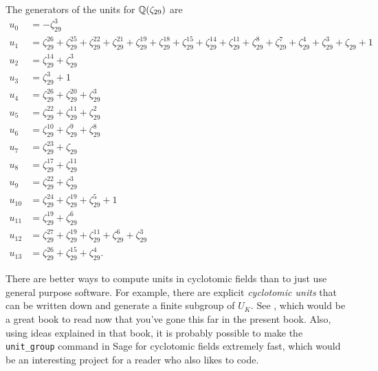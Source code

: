 The generators of the units for $\mathbb{Q}(\zeta_{29})$ are
\begin{align*}
u_{0} &= -\zeta_{29}^{3}\\
u_{1} &= \zeta_{29}^{26} + \zeta_{29}^{25} + \zeta_{29}^{22} + \zeta_{29}^{21} + \zeta_{29}^{19} + \zeta_{29}^{18} + \zeta_{29}^{15} + \zeta_{29}^{14} + \zeta_{29}^{11} + \zeta_{29}^{8} + \zeta_{29}^{7} + \zeta_{29}^{4} + \zeta_{29}^{3} + \zeta_{29} + 1\\
u_{2} &= \zeta_{29}^{14} + \zeta_{29}^{3}\\
u_{3} &= \zeta_{29}^{3} + 1\\
u_{4} &= \zeta_{29}^{26} + \zeta_{29}^{20} + \zeta_{29}^{3}\\
u_{5} &= \zeta_{29}^{22} + \zeta_{29}^{11} + \zeta_{29}^{2}\\
u_{6} &= \zeta_{29}^{10} + \zeta_{29}^{9} + \zeta_{29}^{8}\\
u_{7} &= \zeta_{29}^{23} + \zeta_{29}\\
u_{8} &= \zeta_{29}^{17} + \zeta_{29}^{11}\\
u_{9} &= \zeta_{29}^{22} + \zeta_{29}^{3}\\
u_{10} &= \zeta_{29}^{24} + \zeta_{29}^{19} + \zeta_{29}^{5} + 1\\
u_{11} &= \zeta_{29}^{19} + \zeta_{29}^{6}\\
u_{12} &= \zeta_{29}^{27} + \zeta_{29}^{19} + \zeta_{29}^{11} + \zeta_{29}^{6} + \zeta_{29}^{3}\\
u_{13} &= \zeta_{29}^{26} + \zeta_{29}^{15} + \zeta_{29}^{4}.
\end{align*}

There are better ways to compute units in cyclotomic fields than to
just use general purpose software. For example, there are explicit
{\em cyclotomic units} that can be written down and generate a finite
subgroup of $U_K$. See \cite[Ch.~8]{washington:cyclo}, which would be
a great book to read now that you've gone this far in the present book.
Also, using ideas explained in that book, it is probably
possible to make the {\tt unit\_group} command in Sage for cyclotomic
fields extremely fast, which would be an interesting project for a
reader who also likes to code.
